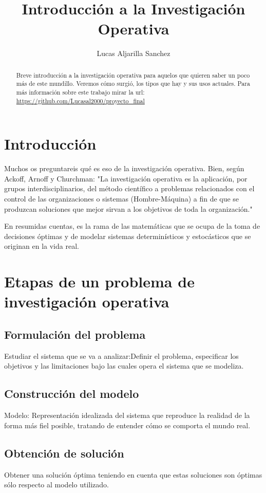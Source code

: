 \documentclass{article}
\author{Lucas Aljarilla Sanchez}
\title{Introducción a la Investigación Operativa}
\begin{document}
\maketitle
\begin{abstract}
Breve introducción a la investigación operativa para aquelos que quieren saber un poco más de este mundillo. Veremos cómo surgió, los tipos que hay y sus usos actuales. Para más información sobre este trabajo mirar la url: \url{https://github.com/Lucasal2000/proyecto_final} 
\end{abstract}
\section{Introducción}

Muchos os preguntareis qué es eso de la investigación operativa. Bien, según Ackoff, Arnoff y Churchman: "La investigación operativa es la aplicación, por grupos interdisciplinarios, del método científico a problemas relacionados con el control de las organizaciones o sistemas (Hombre-Máquina) a fin de que se produzcan soluciones que mejor sirvan a los objetivos de toda la organización."

En resumidas cuentas, es la rama de las matemáticas que se ocupa de la toma de decisiones óptimas y de modelar sistemas determinísticos y estocásticos que se originan en la vida real.

\section{Etapas de un problema de investigación operativa}

\subsection{Formulación del problema}
Estudiar el sistema que se va a analizar:Definir el problema, especificar los objetivos y las limitaciones bajo las cuales opera el sistema que se modeliza.
\subsection{Construcción del modelo}
Modelo: Representación idealizada del sistema que reproduce la realidad de la forma más fiel posible, tratando de entender cómo se comporta el mundo real.
\subsection{Obtención de solución}
Obtener una solución óptima teniendo en cuenta que estas soluciones son óptimas sólo respecto al modelo utilizado.
\end{document}
